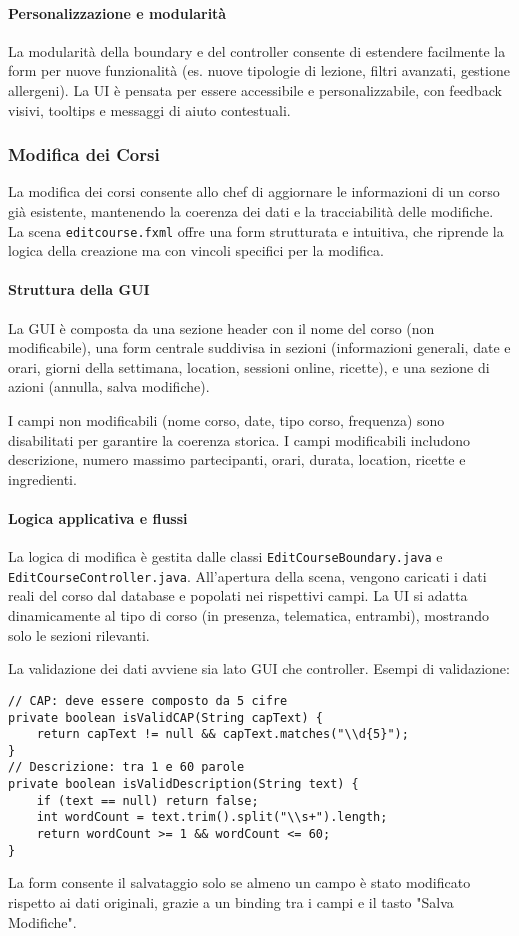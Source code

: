 \paragraph{Personalizzazione e modularità}
La modularità della boundary e del controller consente di estendere facilmente la form per nuove funzionalità (es. nuove tipologie di lezione, filtri avanzati, gestione allergeni). La UI è pensata per essere accessibile e personalizzabile, con feedback visivi, tooltips e messaggi di aiuto contestuali.

\subsubsection{Modifica dei Corsi}

La modifica dei corsi consente allo chef di aggiornare le informazioni di un corso già esistente, mantenendo la coerenza dei dati e la tracciabilità delle modifiche. La scena \texttt{editcourse.fxml} offre una form strutturata e intuitiva, che riprende la logica della creazione ma con vincoli specifici per la modifica.

\paragraph{Struttura della GUI}
La GUI è composta da una sezione header con il nome del corso (non modificabile), una form centrale suddivisa in sezioni (informazioni generali, date e orari, giorni della settimana, location, sessioni online, ricette), e una sezione di azioni (annulla, salva modifiche).

I campi non modificabili (nome corso, date, tipo corso, frequenza) sono disabilitati per garantire la coerenza storica. I campi modificabili includono descrizione, numero massimo partecipanti, orari, durata, location, ricette e ingredienti.

\paragraph{Logica applicativa e flussi}
La logica di modifica è gestita dalle classi \texttt{EditCourseBoundary.java} e \texttt{EditCourseController.java}. All'apertura della scena, vengono caricati i dati reali del corso dal database e popolati nei rispettivi campi. La UI si adatta dinamicamente al tipo di corso (in presenza, telematica, entrambi), mostrando solo le sezioni rilevanti.

La validazione dei dati avviene sia lato GUI che controller. Esempi di validazione:
\begin{verbatim}
// CAP: deve essere composto da 5 cifre
private boolean isValidCAP(String capText) {
    return capText != null && capText.matches("\\d{5}");
}
// Descrizione: tra 1 e 60 parole
private boolean isValidDescription(String text) {
    if (text == null) return false;
    int wordCount = text.trim().split("\\s+").length;
    return wordCount >= 1 && wordCount <= 60;
}
\end{verbatim}
La form consente il salvataggio solo se almeno un campo è stato modificato rispetto ai dati originali, grazie a un binding tra i campi e il tasto "Salva Modifiche".
